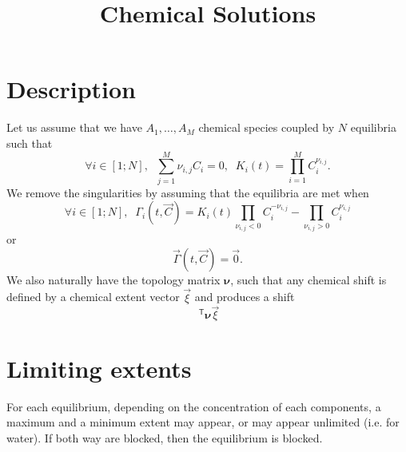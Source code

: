 \documentclass[aps]{revtex4}
\newcommand{\mymat}[1]{\bm{#1}}
\newcommand{\mytrn}[1]{~^{\mathsf{T}}{#1}}
\begin{document}
\title{Chemical Solutions}

\section{Description}
Let us assume that we have $A_1,\ldots,A_M$ chemical species coupled by
$N$ equilibria such that
\begin{equation}
	\forall i \in [1;N], \;\; \sum_{j=1}^{M} \nu_{i,j} C_i = 0, \;\; K_i(t) = \prod_{i=1}^{M} C_i^{\nu_{i,j}}.
\end{equation}
We remove the singularities by assuming that the equilibria are met when
\begin{equation}
	\forall i \in [1;N], \;\; \Gamma_i(t,\vec{C}) = K_i(t) \prod_{\nu_{i,j}<0}  C_i^{-\nu_{i,j}} -  \prod_{\nu_{i,j}>0} C_i^{\nu_{i,j}} 
\end{equation}
or
\begin{equation}
	\vec{\Gamma}(t,\vec{C}) = \vec{0}.
\end{equation}
We also naturally have the topology matrix $\mymat{\nu}$, such that
any chemical shift is defined by a  chemical extent vector $\vec{\xi}$ and
produces a shift
$$
	\mytrn{\mymat{\nu}}\vec{\xi}
$$

\section{Limiting extents}
For each equilibrium, depending on the concentration of each components, a 
maximum and a minimum extent may appear, or may
appear unlimited (i.e. for water).
If both way are blocked, then the equilibrium is blocked.
\end{document}
